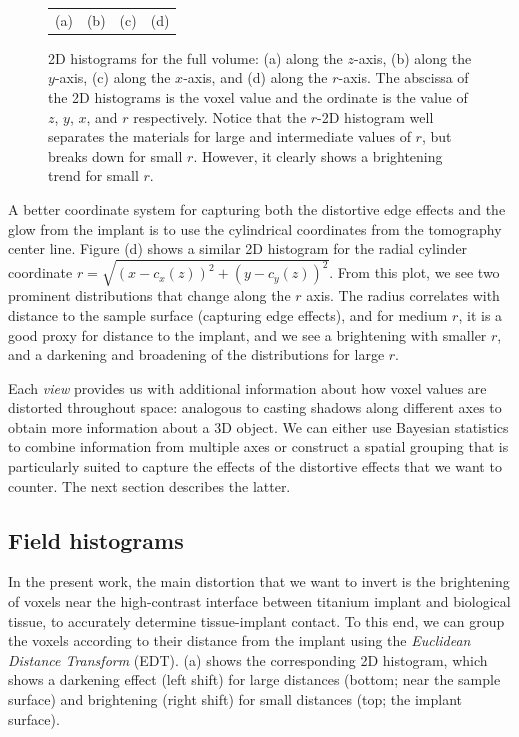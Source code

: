 \begin{figure}
\begin{tabular}{cccc}
        (a) & (b) & (c) & (d)
    \end{tabular}
    \caption{
        2D histograms for the full volume: (a) along the $z$-axis, (b) along
        the $y$-axis, (c) along the $x$-axis, and (d) along the $r$-axis. The
        abscissa of the 2D histograms is the voxel value and the ordinate is
        the value of $z$, $y$, $x$, and $r$ respectively. Notice that the
        $r$-2D histogram well separates the materials for large and
        intermediate values of $r$, but breaks down for small $r$. However, it
        clearly shows a brightening trend for small $r$.
    }
    \label{fig:2dhists}
\end{figure}

A better coordinate system for capturing both the distortive edge effects and
the glow from the implant is to use the cylindrical coordinates from the
tomography center line. Figure (d) shows a similar 2D
histogram for the radial cylinder coordinate $r=\sqrt{\left(
x-c_x(z)\right)^2+\left( y-c_y(z)\right)^2}$. From this plot, we see two
prominent distributions that change along the $r$ axis. The radius correlates
with distance to the sample surface (capturing edge effects), and for medium
$r$, it is a good proxy for distance to the implant, and we see a brightening
with smaller $r$, and a darkening and broadening of the distributions for large
$r$.

Each \textit{view} provides us with additional information about how voxel
values are distorted throughout space: analogous to casting shadows along
different axes to obtain more information about a 3D object. We can either use
Bayesian statistics to combine information from multiple axes or construct a
spatial grouping that is particularly suited to capture the effects of the
distortive effects that we want to counter. The next section describes the
latter.

\subsection{Field histograms}

In the present work, the main distortion that we want to invert is the
brightening of voxels near the high-contrast interface between titanium implant
and biological tissue, to accurately determine tissue-implant contact. To this
end, we can group the voxels according to their distance from the implant using
the \textit{Euclidean Distance Transform} (EDT). (a) shows
the corresponding 2D histogram, which shows a darkening effect (left shift) for
large distances (bottom; near the sample surface) and brightening (right shift)
for small distances (top; the implant surface).

